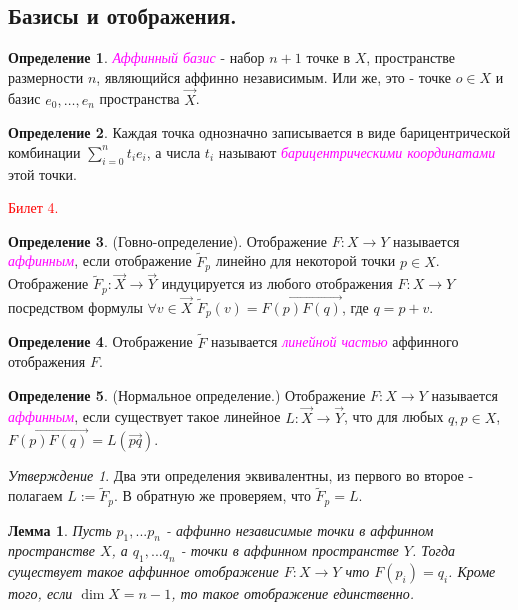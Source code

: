 \documentclass[a4paper,100pt]{article}
\theoremstyle{indented}
\newtheorem{lemma}{Лемма}
\theoremstyle{definition}
\newtheorem{defn}{Определение}
\theoremstyle{remark}
\newtheorem{stat}{Утверждение}
\DeclareMathOperator{\ra}{\rightarrow}
\begin{document}
\subsection{Базисы и отображения.}

\begin{defn}
    \textit{\textcolor{magenta}{\hypertarget{s24}{Аффинный базис}}} - набор $n+1$ точке в $X$, пространстве размерности $n$, являющийся аффинно независимым. Или же, это - точке $o\in X$ и базис $e_0, \ldots, e_n$ пространства $\vec{X}$. 
\end{defn}

\begin{defn}
    Каждая точка однозначно записывается в виде барицентрической комбинации $\sum_{i=0}^n t_i e_i$, а числа $t_i$ называют \textit{\textcolor{magenta}{\hypertarget{s25}{барицентрическими координатами}}} этой точки.
\end{defn}

\textcolor{red}{\hypertarget{b4}{Билет 4.}}

\begin{defn}
    (Говно-определение). Отображение $F:X\ra Y$ называется \textit{\textcolor{magenta}{\hypertarget{s26}{аффинным}}}, если отображение $\tilde{F}_p$ линейно для некоторой точки $p\in X$. Отображение $\tilde{F}_p:\vec{X}\ra\vec{Y}$ индуцируется из любого отображения $F:X\ra Y$ посредством формулы $\forall v\in \vec{X}$ $\tilde{F}_p(v)=\overrightarrow{F(p)F(q)}$, где $q=p+v$. 
\end{defn}

\begin{defn}
    Отображение $\tilde{F}$ называется \textit{\textcolor{magenta}{\hypertarget{s27}{линейной частью}}} аффинного отображения $F$.
\end{defn}

\begin{defn}
    (Нормальное определение.) Отображение $F:X\ra Y$ называется \textit{\textcolor{magenta}{\hypertarget{s28}{аффинным}}}, если существует такое линейное $L:\vec{X}\ra\vec{Y}$, что для любых $q, p\in X$, $\overrightarrow{F(p)F(q)}=L(\vec{pq})$. 
\end{defn}

\begin{stat}
    Два эти определения эквивалентны, из первого во второе - полагаем $L := \tilde{F}_p$. В обратную же проверяем, что $\tilde{F}_p = L$. 
\end{stat}

\begin{lemma}
    Пусть $p_1, ... p_n$ - аффинно независимые точки в аффинном пространстве $X$, а $q_1, ... q_n$ - точки в аффинном пространстве $Y$. Тогда существует такое аффинное отображение $F: X \rightarrow Y$ что $F(p_i)=q_i$. Кроме того, если $\dim X = n-1$, то такое отображение единственно.
\end{lemma}
\end{document}
